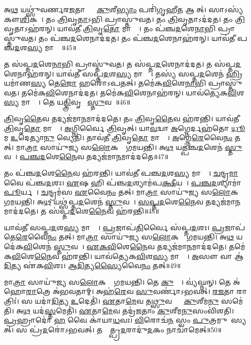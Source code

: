 𑌅\ul{𑌥} 𑌯𑌥𑍍𑌸𑍁॑𑌵𑌰𑍍𑌣𑌰\ul{𑌜}𑌤𑌾𑌭𑍍𑌯𑌾𑌂᳚ \ul{𑌕𑍁}𑌶𑍀\ul{𑌭𑍍𑌯𑌾𑌂} 𑌪𑌰𑌿॑𑌗𑍃𑌹𑍀\ul{𑌤} 𑌆𑌸𑍀᳚𑌤𑍍।
𑌸𑌾𑌽𑌸𑍍𑌯॑ 𑌕𑍗\ul{𑌶𑌿}𑌕𑌤𑌾᳚।
𑌤𑌂 \ul{𑌤𑍍𑌰𑌿}𑌵𑍃\ul{𑌤𑌾}𑌽𑌭𑌿 𑌪𑍍𑌰𑌾𑌸𑍍𑌤𑍁॑𑌵𑌤।
𑌤𑌂 \ul{𑌤𑍍𑌰𑌿}𑌵𑍃𑌤𑌾\-𑌽𑌦॑𑌦𑌤।
𑌤𑌂 \ul{𑌤𑍍𑌰𑌿}𑌵𑍃𑌤𑌾\-𑌽𑌹॑𑌰𑌨𑍍।
𑌯𑌾𑌵॑𑌤𑍀 \ul{𑌤𑍍𑌰𑌿}𑌵𑍃\ul{𑌤𑍋} 𑌮𑌾𑌤𑍍𑌰𑌾᳚।
𑌤𑌂 𑌪॑𑌞𑍍𑌚\ul{𑌦}𑌶𑍇\ul{𑌨𑌾}𑌭𑌿 𑌪𑍍𑌰𑌾𑌸𑍍𑌤𑍁॑𑌵𑌤।
𑌤𑌂 𑌪॑𑌞𑍍𑌚\ul{𑌦}𑌶𑍇𑌨𑌾𑌦॑𑌦𑌤।
𑌤𑌂 𑌪॑𑌞𑍍𑌚\ul{𑌦}𑌶𑍇𑌨𑌾𑌹॑𑌰𑌨𑍍।
𑌯𑌾𑌵॑𑌤𑍀 𑌪𑌞𑍍𑌚\ul{𑌦}𑌶\ul{𑌸𑍍𑌯} 𑌮𑌾𑌤𑍍𑌰𑌾᳚॥45॥

𑌤 𑌸॑𑌪𑍍𑌤\ul{𑌦}𑌶𑍇\ul{𑌨𑌾}𑌭𑌿 𑌪𑍍𑌰𑌾𑌸𑍍𑌤𑍁॑𑌵𑌤।
𑌤 𑌸॑𑌪𑍍𑌤\ul{𑌦}𑌶𑍇𑌨𑌾𑌦॑𑌦𑌤।
𑌤 𑌸॑𑌪𑍍𑌤\ul{𑌦}𑌶𑍇𑌨𑌾𑌹॑𑌰𑌨𑍍।
𑌯𑌾𑌵॑𑌤𑍀 𑌸𑌪𑍍𑌤\ul{𑌦}𑌶\ul{𑌸𑍍𑌯} 𑌮𑌾𑌤𑍍𑌰𑌾᳚।
𑌤𑌸𑍍𑌯॑ 𑌸𑌪𑍍𑌤\ul{𑌦}𑌶𑍇𑌨॑ \ul{𑌹𑍍𑌰𑌿}𑌯𑌮𑌾॑𑌣\ul{𑌸𑍍𑌯} 𑌤𑍇\ul{𑌜𑍋} 𑌹𑌰𑍋॑\-𑌽𑌪𑌤𑌤𑍍।
𑌤𑌮𑍇॑𑌕\ul{𑌵𑌿}\ul{}𑌶𑍇\ul{𑌨𑌾}𑌭𑌿 𑌪𑍍𑌰𑌾𑌸𑍍𑌤𑍁॑𑌵𑌤।
𑌤𑌮𑍇॑𑌕\ul{𑌵𑌿}\ul{}𑌶𑍇𑌨𑌾𑌦॑𑌦𑌤।
𑌤𑌮𑍇॑𑌕\ul{𑌵𑌿}\ul{}𑌶𑍇𑌨𑌾𑌹॑𑌰𑌨𑍍।
𑌯𑌾𑌵॑𑌤𑍍𑌯𑍇𑌕\ul{𑌵𑌿}\ul{}𑌶\ul{𑌸𑍍𑌯} 𑌮𑌾𑌤𑍍𑌰𑌾᳚।
𑌤𑍇 𑌯\ul{𑌤𑍍𑌤𑍍𑌰𑌿}𑌵𑍃𑌤𑌾᳚ \ul{𑌸𑍍𑌤𑍁}𑌵𑌤𑍇᳚॥46॥

\ul{𑌤𑍍𑌰𑌿}𑌵𑍃\ul{𑌤𑍈}𑌵 𑌤𑌦𑍍𑌯𑌜॑𑌮𑌾\ul{𑌨}𑌮𑌾𑌦॑𑌦𑌤𑍇।
𑌤𑌂 \ul{𑌤𑍍𑌰𑌿}𑌵𑍃\ul{𑌤𑍈}𑌵 𑌹॑𑌰𑌨𑍍𑌤𑌿।
𑌯𑌾𑌵॑𑌤𑍀 \ul{𑌤𑍍𑌰𑌿}𑌵𑍃\ul{𑌤𑍋} 𑌮𑌾𑌤𑍍𑌰𑌾᳚।
\ul{𑌅}𑌗𑍍𑌨𑌿𑌰𑍍𑌵𑍈 \ul{𑌤𑍍𑌰𑌿}𑌵𑍃𑌤𑍍।
𑌯𑌾\ul{𑌵}𑌦𑍍𑌵𑌾 \ul{𑌅}𑌗𑍍𑌨𑍇𑌰𑍍𑌦𑌹॑𑌤𑍋 \ul{𑌧𑍂}𑌮 \ul{𑌉}𑌦𑍇𑌤𑍍𑌯𑌾\ul{𑌨𑍁} 𑌵𑍍𑌯𑍇𑌤𑌿॑।
𑌤𑌾𑌵॑𑌤𑍀 \ul{𑌤𑍍𑌰𑌿}𑌵𑍃\ul{𑌤𑍋} 𑌮𑌾𑌤𑍍𑌰𑌾᳚।
\ul{𑌅}𑌗𑍍𑌨𑍇\ul{𑌰𑍇}𑌵𑍈\ul{𑌨𑌂} 𑌤𑌤𑍍।
𑌮𑌾\ul{𑌤𑍍𑌰𑌾}\ul{} 𑌸𑌾𑌯𑍁॑𑌜𑍍𑌯 𑌸\ul{𑌲𑍋}𑌕𑌤𑌾𑌂᳚ 𑌗𑌮𑌯𑌨𑍍𑌤𑌿।
𑌅\ul{𑌥} 𑌯𑌤𑍍𑌪॑𑌞𑍍𑌚\ul{𑌦}𑌶𑍇𑌨॑ \ul{𑌸𑍍𑌤𑍁}𑌵𑌤𑍇᳚।
\ul{𑌪}\ul{𑌞𑍍𑌚}\ul{𑌦}𑌶𑍇\ul{𑌨𑍈}𑌵 𑌤𑌦𑍍𑌯𑌜॑𑌮𑌾\ul{𑌨}𑌮𑌾𑌦॑𑌦𑌤𑍇॥47॥

𑌤𑌂 𑌪॑𑌞𑍍𑌚\ul{𑌦}𑌶𑍇\ul{𑌨𑍈}𑌵 𑌹॑𑌰𑌨𑍍𑌤𑌿।
𑌯𑌾𑌵॑𑌤𑍀 𑌪𑌞𑍍𑌚\ul{𑌦}𑌶\ul{𑌸𑍍𑌯} 𑌮𑌾𑌤𑍍𑌰𑌾᳚।
\ul{𑌚}𑌨𑍍𑌦𑍍𑌰\ul{𑌮𑌾} 𑌵𑍈 𑌪॑𑌞𑍍𑌚\ul{𑌦}𑌶𑌃।
\ul{𑌏}𑌷 𑌹𑌿 𑌪॑𑌞𑍍𑌚\ul{𑌦}𑌶𑍍𑌯𑌾𑌮॑𑌪\ul{𑌕𑍍𑌷𑍀}𑌯𑌤𑍇᳚।
\ul{𑌪}\ul{𑌞𑍍𑌚}\ul{𑌦}𑌶𑍍𑌯𑌾𑌮𑌾॑\ul{𑌪𑍂}𑌰𑍍𑌯𑌤𑍇᳚।
\ul{𑌚}𑌨𑍍𑌦𑍍𑌰𑌮॑𑌸 \ul{𑌏}𑌵𑍈\ul{𑌨𑌂} 𑌤𑌤𑍍।
𑌮𑌾\ul{𑌤𑍍𑌰𑌾}\ul{} 𑌸𑌾𑌯𑍁॑𑌜𑍍𑌯 𑌸\ul{𑌲𑍋}𑌕𑌤𑌾𑌂᳚ 𑌗𑌮𑌯𑌨𑍍𑌤𑌿।
𑌅\ul{𑌥} 𑌯𑌥𑍍𑌸॑𑌪𑍍𑌤\ul{𑌦}𑌶𑍇𑌨॑ \ul{𑌸𑍍𑌤𑍁}𑌵𑌤𑍇᳚।
\ul{𑌸}\ul{𑌪𑍍𑌤}\ul{𑌦}𑌶𑍇\ul{𑌨𑍈}𑌵 𑌤𑌦𑍍𑌯𑌜॑𑌮𑌾\ul{𑌨}𑌮𑌾𑌦॑𑌦𑌤𑍇।
𑌤 𑌸॑𑌪𑍍𑌤\ul{𑌦}𑌶𑍇\ul{𑌨𑍈}𑌵 𑌹॑𑌰𑌨𑍍𑌤𑌿॥48॥

𑌯𑌾𑌵॑𑌤𑍀 𑌸𑌪𑍍𑌤\ul{𑌦}𑌶\ul{𑌸𑍍𑌯} 𑌮𑌾𑌤𑍍𑌰𑌾᳚।
\ul{𑌪𑍍𑌰}𑌜𑌾𑌪॑\ul{𑌤𑌿}𑌰𑍍𑌵𑍈 𑌸॑𑌪𑍍𑌤\ul{𑌦}𑌶𑌃।
\ul{𑌪𑍍𑌰}𑌜𑌾𑌪॑𑌤𑍇\ul{𑌰𑍇}𑌵𑍈\ul{𑌨𑌂} 𑌤𑌤𑍍।
𑌮𑌾\ul{𑌤𑍍𑌰𑌾}\ul{} 𑌸𑌾𑌯𑍁॑𑌜𑍍𑌯 𑌸\ul{𑌲𑍋}𑌕𑌤𑌾𑌂᳚ 𑌗𑌮𑌯𑌨𑍍𑌤𑌿।
𑌅\ul{𑌥} 𑌯𑌦𑍇॑𑌕\ul{𑌵𑌿}\ul{}𑌶𑍇𑌨॑ \ul{𑌸𑍍𑌤𑍁}𑌵𑌤𑍇᳚।
\ul{𑌏}\ul{𑌕}\ul{𑌵𑌿}\ul{}𑌶𑍇\ul{𑌨𑍈}𑌵 𑌤𑌦𑍍𑌯𑌜॑𑌮𑌾\ul{𑌨}𑌮𑌾𑌦॑𑌦𑌤𑍇।
𑌤𑌮𑍇॑𑌕\ul{𑌵𑌿}\ul{}𑌶𑍇\ul{𑌨𑍈}𑌵 𑌹॑𑌰𑌨𑍍𑌤𑌿।
𑌯𑌾𑌵॑𑌤𑍍𑌯𑍇𑌕\-\ul{𑌵𑌿}\ul{}𑌶\ul{𑌸𑍍𑌯} 𑌮𑌾𑌤𑍍𑌰𑌾᳚।
\ul{𑌅}𑌸𑍗 𑌵𑌾 𑌆॑\ul{𑌦𑌿}𑌤𑍍𑌯 𑌏॑𑌕\ul{𑌵𑌿}\ul{}𑌶𑌃।
\ul{𑌆}\ul{𑌦𑌿}𑌤𑍍𑌯\ul{𑌸𑍍𑌯𑍈}𑌵𑍈\ul{𑌨𑌂} 𑌤𑌤𑍍॥49॥

𑌮𑌾\ul{𑌤𑍍𑌰𑌾}\ul{} 𑌸𑌾𑌯𑍁॑𑌜𑍍𑌯 𑌸\ul{𑌲𑍋}𑌕𑌤𑌾𑌂᳚ 𑌗𑌮𑌯𑌨𑍍𑌤𑌿।
𑌤𑍇 \ul{𑌕𑍁}𑌶𑍍𑌯𑍗᳚।
𑌵𑍍𑌯॑𑌘𑍍𑌨𑌨𑍍।
𑌤𑍇 𑌅॑𑌹𑍋\ul{𑌰𑌾}𑌤𑍍𑌰𑍇 𑌅॑𑌭𑌵𑌤𑌾𑌮𑍍।
𑌅𑌹॑\ul{𑌰𑍇}𑌵 \ul{𑌸𑍁}𑌵𑌰𑍍𑌣𑌾॑\-𑌽𑌭𑌵𑌤𑍍।
\ul{𑌰}\ul{𑌜}𑌤𑌾 𑌰𑌾𑌤𑍍𑌰𑌿𑌃॑।
𑌸 𑌯𑌦𑌾॑\ul{𑌦𑌿}𑌤𑍍𑌯 \ul{𑌉}𑌦𑍇𑌤𑌿॑।
\ul{𑌏}𑌤𑌾\ul{𑌮𑍇}𑌵 𑌤\ul{𑌥𑍍𑌸𑍁}𑌵𑌰𑍍𑌣𑌾𑌂᳚ \ul{𑌕𑍁}𑌶𑍀𑌮\ul{𑌨𑍁} 𑌸𑌮𑍇॑𑌤𑌿।
𑌅\ul{𑌥} 𑌯𑌦॑\ul{𑌸𑍍𑌤}𑌮𑍇𑌤𑌿॑।
\ul{𑌏}𑌤𑌾\ul{𑌮𑍇}𑌵 𑌤𑌦𑍍𑌰॑\ul{𑌜}𑌤𑌾𑌂 \ul{𑌕𑍁}𑌶𑍀𑌮\ul{𑌨𑍁}𑌸𑌂𑌵𑌿॑𑌶𑌤𑌿।
\ul{𑌪𑍍𑌰}𑌹𑍍𑌰𑌾𑌦𑍋॑ \ul{𑌹} 𑌵𑍈 𑌕𑌾॑𑌯𑌾\ul{𑌧}𑌵𑌃।
\ul{𑌵𑌿}𑌰𑍋𑌚॑\ul{𑌨}\ul{} 𑌸𑍍𑌵𑌂 \ul{𑌪𑍁}𑌤𑍍𑌰𑌮𑍁𑌦𑌾᳚𑌸𑍍𑌯𑌤𑍍।
𑌸 𑌪𑍍𑌰॑\ul{𑌦}𑌰𑍋॑\-𑌽𑌭𑌵𑌤𑍍।
𑌤𑌸𑍍𑌮𑌾᳚𑌤𑍍𑌪𑍍𑌰\ul{𑌦}𑌰𑌾𑌦𑍁॑\ul{𑌦}𑌕𑌂 𑌨𑌾𑌚𑌾॑𑌮𑍇𑌤𑍍॥50॥\anuvakamend[\ul{𑌆}\ul{𑌦𑌿}𑌤𑍍𑌯𑌃 𑌪॑𑌞𑍍𑌚\ul{𑌦}𑌶\ul{𑌸𑍍𑌯} 𑌮𑌾𑌤𑍍𑌰𑌾᳚ \ul{𑌸𑍍𑌤𑍁}𑌵𑌤𑍇॑ 𑌪𑌞𑍍𑌚\ul{𑌦}𑌶𑍇\ul{𑌨𑍈}𑌵 𑌤𑌦𑍍𑌯𑌜॑𑌮𑌾\ul{𑌨}𑌮𑌾𑌦॑𑌦𑌤𑍇 𑌸𑌪𑍍𑌤\ul{𑌦}𑌶𑍇\ul{𑌨𑍈}𑌵 𑌹॑𑌰𑌨𑍍𑌤𑍍𑌯𑌾\ul{𑌦𑌿}𑌤𑍍𑌯\ul{𑌸𑍍𑌯𑍈}𑌵𑍈\ul{𑌨𑌂} 𑌤𑌦𑍍𑌵𑌿॑𑌶𑌤𑌿 \ul{𑌚}𑌤𑍍𑌵𑌾𑌰𑌿॑ 𑌚]

